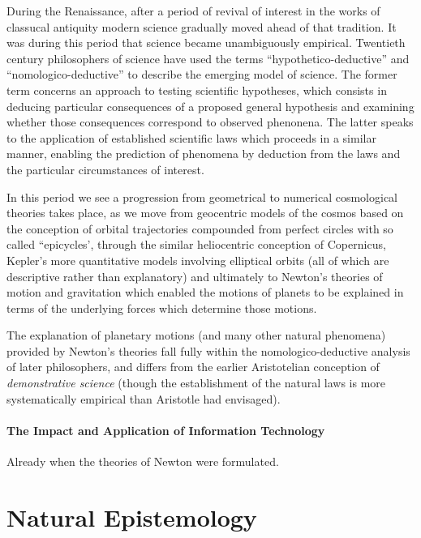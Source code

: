 \documentclass[10pt,titlepage]{book}
\begin{document}
During the Renaissance, after a period of revival of interest in the works of classucal antiquity modern science gradually moved ahead of that tradition.
It was during this period that science became unambiguously empirical.
Twentieth century philosophers of science have used the terms ``hypothetico-deductive'' and ``nomologico-deductive'' to describe the emerging model of science.
The former term concerns an approach to testing scientific hypotheses, which consists in deducing particular consequences of a proposed general hypothesis and examining whether those consequences correspond to observed phenonena.
The latter speaks to the application of established scientific laws which proceeds in a similar manner, enabling the prediction of phenomena by deduction from the laws and the particular circumstances of interest.

In this period we see a progression from geometrical to numerical cosmological theories takes place, as we move from geocentric models of the cosmos based on the conception of orbital trajectories compounded from perfect circles with so called ``epicycles', through the similar heliocentric conception of Copernicus, Kepler's more quantitative models involving elliptical orbits (all of which are descriptive rather than explanatory) and ultimately to Newton's theories of motion and gravitation which enabled the motions of planets to be explained in terms of the underlying forces which determine those motions.

The explanation of planetary motions (and many other natural phenomena) provided by Newton's theories fall fully within the nomologico-deductive analysis of later philosophers, and differs from the earlier Aristotelian conception of \emph{demonstrative science} (though the establishment of the natural laws is more systematically empirical than Aristotle had envisaged).



\subsection{The Impact and Application of Information Technology}

Already when the theories of Newton were formulated.



\part{Natural Epistemology}
\end{document}
